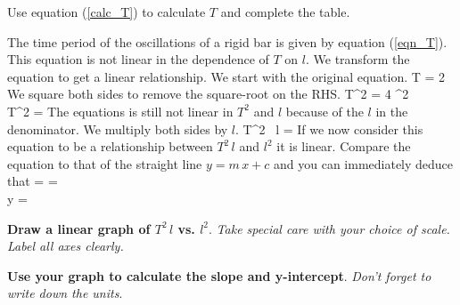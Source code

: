 \documentclass{article}
\begin{document}
      Use equation (\ref{calc_T}) to calculate $T$ and complete the table.

      The time period of the oscillations of a rigid bar is given by equation (\ref{eqn_T}). This equation is not linear in the dependence of $T$ on $l$. We transform the equation to get a linear relationship. We start with the original equation.
%
      \beqn
         T = 2 \pi {}
      \eeqn
      We square both sides to remove the square-root on the RHS.
      \beqsn
         T^2 = 4 \pi^2  \\[0.25\baselineskip]
         \imply T^2 =  
      \eeqsn
      The equations is still not linear in $T^2$ and $l$ because of the $l$ in the denominator. We multiply both sides by $l$.
      \beq
         T^2 \, l =  
      \eeq
      If we now consider this equation to be a relationship between $T^2 \, l$ and $l^2$ it is linear. Compare the equation to that of the straight line $y = m \, x + c$ and you can immediately deduce that
      \beqcn
          =  = \\[0.5\baselineskip]
         y = 
      \eeqcn

      \textbf{Draw a linear graph of $T^2 \, l$ vs. $l^2$}. \textit{Take special care with your choice of scale. Label all axes clearly.}

      \textbf{Use your graph to calculate the slope and y-intercept}. \textit{Don't forget to write down the units}.
\end{document}

